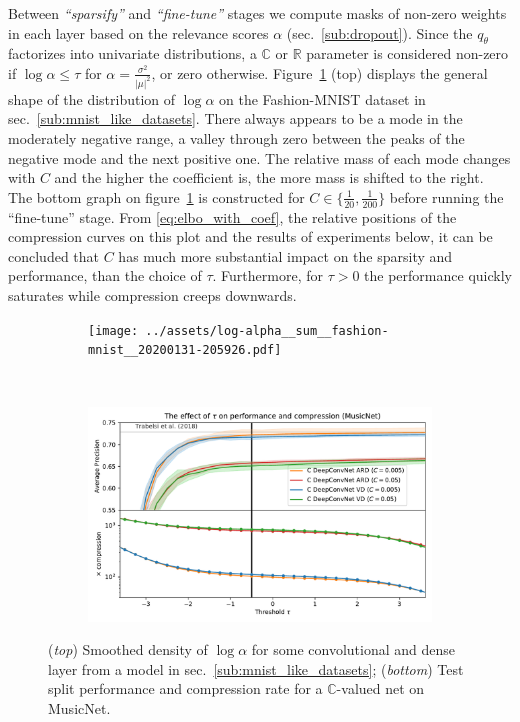 \documentclass[a4paper,10pt]{article}
\newcommand{\real}{\mathbb{R}}
\newcommand{\cplx}{\mathbb{C}}
\begin{document}
Between \textit{``sparsify''} and \textit{``fine-tune''} stages we compute masks of non-zero
weights in each layer based on the relevance scores $\alpha$ (sec.~\ref{sub:dropout}). Since
the $q_\theta$ factorizes into univariate distributions, a $\cplx$ or $\real$ parameter is
considered non-zero if $\log \alpha \leq \tau$ for $
  \alpha = \tfrac{\sigma^2}{\lvert\mu\rvert^2}
$, or zero otherwise. Figure~\ref{fig:hist__and__threshold__tradeoff} (top) displays the
general shape of the distribution of $\log \alpha$ on the Fashion-MNIST dataset in
sec.~\ref{sub:mnist_like_datasets}. There always appears to be a mode in the moderately
negative range, a valley through zero between the peaks of the negative mode and the next
positive one. The relative mass of each mode changes with $C$ and the higher the coefficient
is, the more mass is shifted to the right.
%
The bottom graph on figure~\ref{fig:hist__and__threshold__tradeoff} is constructed
for $C \in \{\tfrac1{20}, \frac1{200}\}$ before running the ``fine-tune'' stage. From
\eqref{eq:elbo_with_coef}, the relative positions of the compression curves on this
plot and the results of experiments below, it can be concluded that $C$ has much more
substantial impact on the sparsity and performance, than the choice of $\tau$. Furthermore,
for $\tau > 0$ the performance quickly saturates while compression creeps downwards.

\begin{figure}[ht]
  \centering
  \begin{subfigure}[b]{0.95\textwidth}  %
    \centering
    \texttt{[image: ../assets/log-alpha\_\_sum\_\_fashion-mnist\_\_20200131-205926.pdf]}
  \end{subfigure} \\%
  \begin{subfigure}[b]{0.95\textwidth}  %
    \centering
    \includegraphics[width=\linewidth]{../assets/figure__musicnet__threshold.pdf}
  \end{subfigure}
  \caption{%
    (\textit{top}) Smoothed density of $\log\alpha$ for some convolutional and dense layer
    from a model in sec.~\ref{sub:mnist_like_datasets};
    (\textit{bottom}) Test split performance and compression rate for a $\cplx$-valued
    net on MusicNet.
  }
  \label{fig:hist__and__threshold__tradeoff}
\end{figure}
\end{document}
